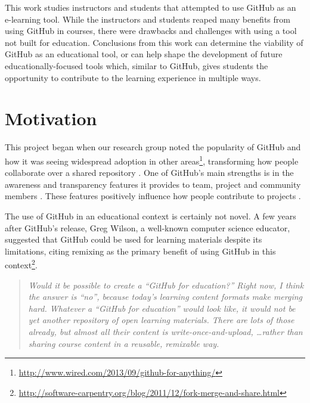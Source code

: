 
This work studies instructors and students that attempted to use GitHub as an e-learning tool. While the instructors and students reaped many benefits from using GitHub in courses, there were drawbacks and challenges with using a tool not built for education. Conclusions from this work can determine the viability of GitHub as an educational tool, or can help shape the development of future educationally-focused tools which, similar to GitHub, gives students the opportunity to contribute to the learning experience in multiple ways.

\section{Motivation}
This project began when our research group noted the popularity of GitHub and how it was seeing widespread adoption in other areas\footnote{\url{http://www.wired.com/2013/09/github-for-anything/}}, transforming how people collaborate over a shared repository \cite{begel2013social}. One of GitHub's main strengths is in the awareness and transparency features it provides to team, project and community members \cite{dabbish2012social}. These features positively influence how people contribute to projects \cite{Tsay:2012:SMS:2141512.2141583}.

The use of GitHub in an educational context is certainly not novel. A few years after GitHub's release, Greg Wilson, a well-known computer science educator, suggested that GitHub could be used for learning materials despite its limitations, citing remixing as the primary benefit of using GitHub in this context\footnote{\url{http://software-carpentry.org/blog/2011/12/fork-merge-and-share.html}}.

\begin{quote}\textit{Would it be possible to create a ``GitHub for education?'' Right now, I think the answer is ``no'', because today's learning content formats make merging hard. Whatever a ``GitHub for education'' would look like, it would not be yet another repository of open learning materials. There are lots of those already, but almost all their content is write-once-and-upload, \ldots rather than sharing course content in a reusable, remixable way.}\end{quote}

